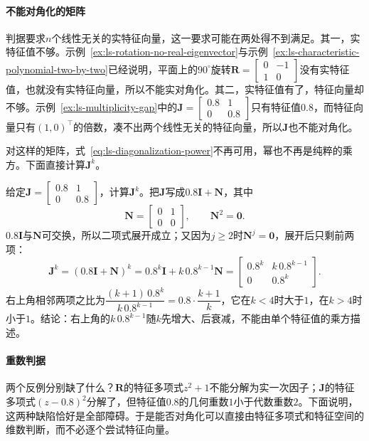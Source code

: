 \paragraph{不能对角化的矩阵}
判据要求$n$个线性无关的实特征向量，这一要求可能在两处得不到满足。其一，实特征值不够。示例~\ref{ex:ls-rotation-no-real-eigenvector}与示例~\ref{ex:ls-characteristic-polynomial-two-by-two}已经说明，平面上的$90^\circ$旋转$\bm R=\left[\begin{smallmatrix}0&-1\\1&0\end{smallmatrix}\right]$没有实特征值，也就没有实特征向量，所以不能实对角化。其二，实特征值有了，特征向量却不够。示例~\ref{ex:ls-multiplicity-gap}中的$\bm J=\left[\begin{smallmatrix}0.8&1\\0&0.8\end{smallmatrix}\right]$只有特征值$0.8$，而特征向量只有$(1,0)^{\top}$的倍数，凑不出两个线性无关的特征向量，所以$\bm J$也不能对角化。

对这样的矩阵，式~\eqref{eq:ls-diagonalization-power}不再可用，幂也不再是纯粹的乘方。下面直接计算$\bm J^k$。
\begin{example}[不能对角化矩阵的幂]
\label{ex:ls-jordan-block-power}
给定$\bm J=\left[\begin{smallmatrix}0.8&1\\0&0.8\end{smallmatrix}\right]$，计算$\bm J^k$。把$\bm J$写成$0.8\bm I+\bm N$，其中
\[
 \bm N=\begin{bmatrix}0&1\\0&0\end{bmatrix},\qquad \bm N^2=\bm0 .
\]
$0.8\bm I$与$\bm N$可交换，所以二项式展开成立；又因为$j\geq2$时$\bm N^j=\bm0$，展开后只剩前两项：
\[
 \bm J^k=(0.8\bm I+\bm N)^k=0.8^k\bm I+k\,0.8^{k-1}\bm N=\begin{bmatrix}0.8^k&k\,0.8^{k-1}\\0&0.8^k\end{bmatrix}.
\]
右上角相邻两项之比为$\dfrac{(k+1)\,0.8^{k}}{k\,0.8^{k-1}}=0.8\cdot\dfrac{k+1}{k}$，它在$k<4$时大于$1$，在$k>4$时小于$1$。结论：右上角的$k\,0.8^{k-1}$随$k$先增大、后衰减，不能由单个特征值的乘方描述。
\end{example}

\paragraph{重数判据}
两个反例分别缺了什么？$\bm R$的特征多项式$z^2+1$不能分解为实一次因子；$\bm J$的特征多项式$(z-0.8)^2$分解了，但特征值$0.8$的几何重数$1$小于代数重数$2$。下面说明，这两种缺陷恰好是全部障碍。于是能否对角化可以直接由特征多项式和特征空间的维数判断，而不必逐个尝试特征向量。

